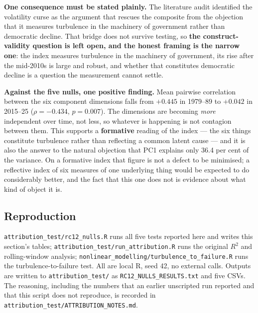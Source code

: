 \textbf{One consequence must be stated plainly.} The literature audit identified the volatility
curse as the argument that rescues the composite from the objection that it measures turbulence in
the machinery of government rather than democratic decline. That bridge does not survive testing, so
\textbf{the construct-validity question is left open, and the honest framing is the narrow one}: the
index measures turbulence in the machinery of government, its rise after the mid-2010s is large and
robust, and whether that constitutes democratic decline is a question the measurement cannot settle.

\textbf{Against the five nulls, one positive finding.} Mean pairwise correlation between the six
component dimensions falls from $+0.445$ in 1979--89 to $+0.042$ in 2015--25 ($\rho=-0.434$,
$p=0.007$). The dimensions are becoming \emph{more} independent over time, not less, so whatever is
happening is not contagion between them. This supports a \textbf{formative} reading of the index ---
the six things constitute turbulence rather than reflecting a common latent cause --- and it is also
the answer to the natural objection that PC1 explains only 36.4 per cent of the variance. On a
formative index that figure is not a defect to be minimised; a reflective index of six measures of
one underlying thing would be expected to do considerably better, and the fact that this one does
not is evidence about what kind of object it is.

\subsection*{Reproduction}

\texttt{attribution\_test/rc12\_nulls.R} runs all five tests reported here and writes this section's
tables; \texttt{attribution\_test/run\_attribution.R} runs the original $R^2$ and rolling-window
analysis; \texttt{nonlinear\_modelling/turbulence\_to\_failure.R} runs the turbulence-to-failure
test. All are local R, seed 42, no external calls. Outputs are written to
\texttt{attribution\_test/} as \texttt{RC12\_NULLS\_RESULTS.txt} and five CSVs. The reasoning,
including the numbers that an earlier unscripted run reported and that this script does not
reproduce, is recorded in \texttt{attribution\_test/ATTRIBUTION\_NOTES.md}.

